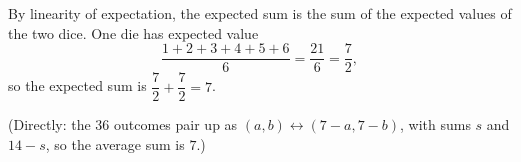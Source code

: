 By linearity of expectation, the expected sum is the sum of the expected values of the two dice. One die has expected value
\[
\dfrac{1+2+3+4+5+6}{6}=\dfrac{21}{6}=\dfrac{7}{2} ,
\]
so the expected sum is $\dfrac{7}{2}+\dfrac{7}{2}=\boxed{7}$.

(Directly: the $36$ outcomes pair up as $(a,b)\leftrightarrow(7-a,7-b)$, with sums $s$ and $14-s$, so the average sum is $7$.)
